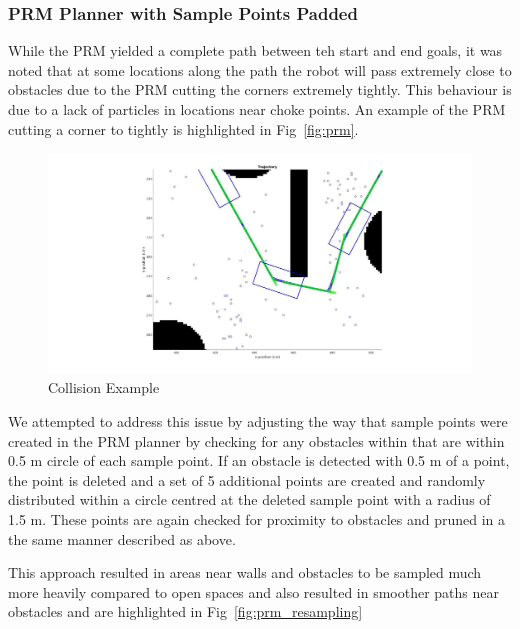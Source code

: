 \documentclass{article}
\begin{document}
\subsubsection{PRM Planner with Sample Points Padded}
\label{subsec:prm_padding}

While the PRM yielded a complete path between teh start and end goals, it was noted that at some locations along the path the robot will pass extremely close to obstacles due to the PRM cutting the corners extremely tightly. This behaviour is due to a lack of particles in locations near choke points. An example of the PRM cutting a corner to tightly is highlighted in  Fig~\ref{fig:prm}. 

\begin{figure}[H]
	\centering
	\includegraphics[width=\linewidth]{images/collision_example.jpg}
	\caption{Collision Example}
	\label{fig:collision_example}
\end{figure}


We attempted to address this issue by adjusting the way that sample points were created in the PRM planner by checking for any obstacles within that are within 0.5 m circle  of each sample point. If an obstacle is detected with 0.5 m of a point, the point is deleted and a set of 5 additional points are created and randomly distributed within a circle centred at the deleted sample point with a radius of 1.5 m. These points are again checked for proximity to obstacles and pruned in a the same manner described as above. 

This approach resulted in areas near walls and obstacles to be sampled much more heavily compared to open spaces and also resulted in smoother paths near obstacles and are highlighted in Fig~\ref{fig:prm_resampling}
\end{document}
